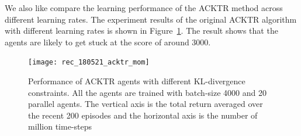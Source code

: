 We also like compare the learning performance of the ACKTR method across different learning rates. The experiment results of the original ACKTR algorithm with different learning rates is shown in Figure~\ref{fig_acktr_mom_tune}. The result shows that the agents are likely to get stuck at the score of around 3000. 
\begin{figure}[!htbp]
	\texttt{[image: rec\_180521\_acktr\_mom]}
	\centering
	\caption{Performance of ACKTR agents with different KL-divergence constraints. All the agents are trained with batch-size 4000 and 20 parallel agents. The vertical axis is the total return averaged over the recent 200 episodes and the horizontal axis is the number of million time-steps}\label{fig_acktr_mom_tune}
\end{figure}

